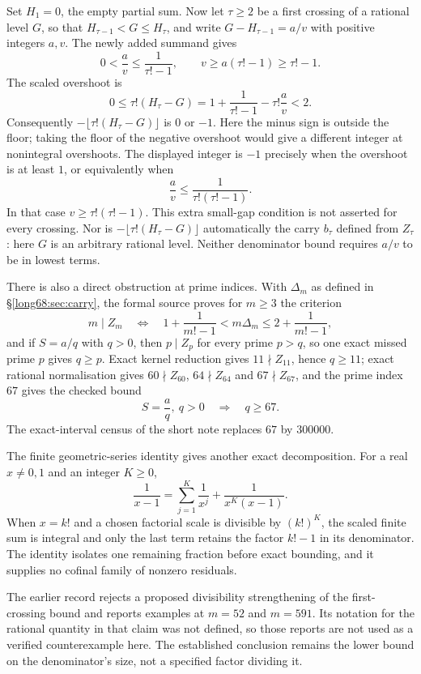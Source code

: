 \documentclass[11pt]{article}
\newcommand{\Ser}{S}
\begin{document}
Set $H_1=0$, the empty partial sum. Now let $\tau\ge2$ be a first
crossing of a rational level $G$, so that
$H_{\tau-1}<G\le H_\tau$, and write $G-H_{\tau-1}=a/v$ with positive
integers $a,v$. The newly added summand gives
\[
 0<\frac av\le\frac1{\tau!-1},
 \qquad v\ge a(\tau!-1)\ge\tau!-1.
\]
The scaled overshoot is
\[
 0\le\tau!(H_\tau-G)
 =1+\frac1{\tau!-1}-\tau!\frac av<2.
\]
Consequently $-\lfloor\tau!(H_\tau-G)\rfloor$ is $0$ or $-1$.
Here the minus sign is outside the floor; taking the floor of the negative
overshoot would give a different integer at nonintegral overshoots.
The displayed integer is $-1$ precisely when the overshoot is at least
$1$, or equivalently when
\[
 \frac av\le\frac1{\tau!(\tau!-1)}.
\]
In that case $v\ge\tau!(\tau!-1)$. This extra small-gap condition is not
asserted for every crossing. Nor is $-\lfloor\tau!(H_\tau-G)\rfloor$
automatically the carry $b_\tau$ defined from $Z_\tau$: here $G$ is an
arbitrary rational level. Neither denominator bound requires $a/v$ to be in lowest terms.

There is also a direct obstruction at prime indices. With $\Delta_m$ as
defined in \S\ref{long68:sec:carry}, the formal source proves for $m\ge3$
the criterion
\[
 m\mid Z_m
 \quad\Longleftrightarrow\quad
 1+\frac1{m!-1}<m\Delta_m\le2+\frac1{m!-1},
\]
and if $\Ser=a/q$ with $q>0$, then $p\mid Z_p$ for every prime $p>q$, so one
exact missed prime $p$ gives $q\ge p$.  Exact kernel reduction gives
$11\nmid Z_{11}$, hence $q\ge11$; exact rational normalisation gives
$60\nmid Z_{60}$, $64\nmid Z_{64}$ and $67\nmid Z_{67}$, and the prime index
$67$ gives the checked bound
\[
 \Ser=\frac aq,\ q>0\quad\Longrightarrow\quad q\ge67 .
\]
The exact-interval census of the short note replaces $67$ by $300000$.

The finite geometric-series identity gives another exact decomposition.  For a real $x\ne0,1$ and an integer $K\ge0$,
\[
 \frac1{x-1}=\sum_{j=1}^{K}\frac1{x^j}+\frac1{x^K(x-1)} .
\]
When $x=k!$ and a chosen factorial scale is divisible by $(k!)^K$, the scaled
finite sum is integral and only the last term retains the factor $k!-1$ in
its denominator.  The identity isolates one remaining fraction before exact
bounding, and it supplies no cofinal family of nonzero residuals.

The earlier record rejects a proposed divisibility strengthening of the
first-crossing bound and reports examples at $m=52$ and $m=591$. Its
notation for the rational quantity in that claim was not defined, so those
reports are not used as a verified counterexample here. The established
conclusion remains the lower bound on the denominator's size, not a
specified factor dividing it.
\end{document}
